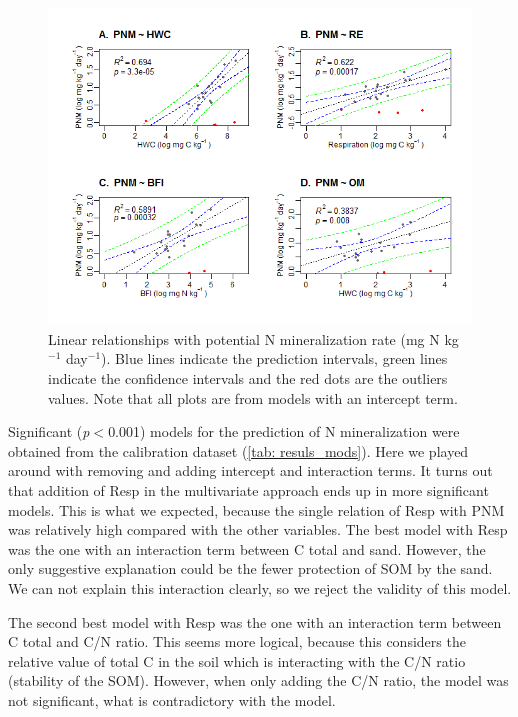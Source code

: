 \documentclass[10pt,twoside,dutch,english]{report}
\begin{document}
\begin{figure}[ht] %
	\includegraphics[width=1\linewidth]{results_models}
	\caption{Linear relationships with potential N mineralization rate (mg N kg$^{-1}$ day$^{-1}$). Blue lines indicate the prediction intervals, green lines indicate the confidence intervals and the red dots are the outliers values. Note that all plots are from models with an intercept term.}
	\label{fig:results_models}
\end{figure}

Significant (\textit{p}$<$0.001) models for the prediction of N mineralization were obtained from the calibration dataset (\ref{tab: resuls_mods}).
 Here we played around with removing and adding intercept and interaction terms. 
 It turns out that addition of Resp in the multivariate approach ends up in more significant models. This is what we expected, because the single relation of Resp with PNM was relatively high compared with the other variables. 
 The best model with Resp was the one with an interaction term between C total and sand. However, the only suggestive explanation could be the fewer protection of SOM by the sand.  We can not explain this interaction clearly, so we reject the validity of this model. 
 
 The second best model with Resp was the one with an interaction term between C total and C/N ratio. This seems more logical, because this considers the relative value of total C in the soil which is interacting with the C/N ratio (stability of the SOM). However, when only adding the C/N ratio, the model was not significant, what is contradictory with the model. 
 
\end{document}
